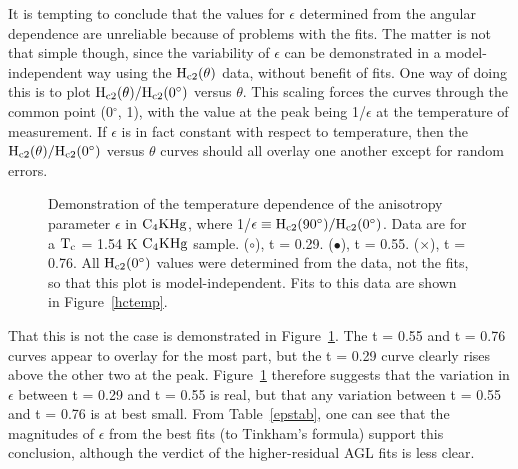         It  is  tempting to   conclude  that  the   values   for $\epsilon$
determined  from the angular dependence  are unreliable because of problems
with the fits.  The matter is not that simple though, since the variability
of $\epsilon$ can be demonstrated in a model-independent way using the $\rm
H_{c2}(\theta)$ data, without benefit of fits.  One way of doing this is to
plot $\rm H_{c2}(\theta)/H_{c2}(0^{\circ})$  versus $\theta$.  This scaling
forces the curves through the common point (0$^{\circ}$, 1), with the value
at  the peak being 1/$\epsilon$ at   the temperature  of measurement.    If
$\epsilon$ is  in fact constant with respect  to temperature, then the $\rm
H_{c2}(\theta)/H_{c2}(0^{\circ})$ versus $\theta$ curves should all overlay
one another except for random errors.

\begin{figure}
\vspace{5in}
\caption[Demonstration of temperature-dependent anisotropy parameter
$\epsilon$ in $\rm C_4KHg$.]{Demonstration of the temperature dependence of
the anisotropy parameter $\epsilon$ in $\rm  C_4KHg$, where 1/$\epsilon \rm
\equiv H_{c2}(90^{\circ})/H_{c2}(0^{\circ})$.   Data are for  a $\rm T_c$ =
1.54 K $\rm C_4KHg$ sample.  ($\circ$),  t = 0.29.   ($\bullet$), t = 0.55.
($\times$), t = 0.76.   All $\rm H_{c2}(0^{\circ})$ values were  determined
from the data, not the fits, so that this plot is model-independent.  Fits
to this data are shown in Figure~\ref{hctemp}.}
\label{epstemp}
\end{figure}

        That this is  not the case  is demonstrated  in Figure~\ref{epstemp}.
The t = 0.55 and t = 0.76 curves appear  to overlay for the most  part, but
the t =  0.29  curve clearly rises  above   the  other two  at   the  peak.
Figure~\ref{epstemp}  therefore  suggests  that  the variation in  $\epsilon$
between t = 0.29 and t = 0.55  is real, but that  any variation between t =
0.55 and t = 0.76 is at best  small.  From Table~\ref{epstab},  one can see
that the   magnitudes  of $\epsilon$  from   the best fits  (to  Tinkham's
formula)   support   this  conclusion,   although    the  verdict  of   the
higher-residual AGL fits is less clear.

